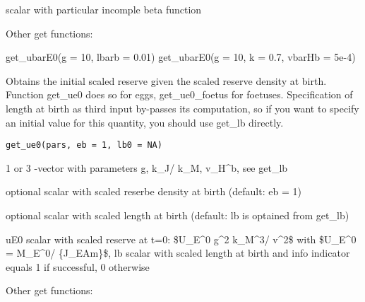 \documentclass[a4paper]{book}
\begin{document}
%
\begin{Value}
scalar with particular incomple beta function
\end{Value}
%
\begin{SeeAlso}\relax
Other get functions: 
\end{SeeAlso}
%
\begin{Examples}
\begin{ExampleCode}
get_ubarE0(g = 10, lbarb = 0.01)
get_ubarE0(g = 10, k = 0.7, vbarHb = 5e-4)
\end{ExampleCode}
\end{Examples}
%
\begin{Description}\relax
Obtains the initial scaled reserve given the scaled reserve density at birth.
Function get\_ue0 does so for eggs, get\_ue0\_foetus for foetuses.
Specification of length at birth as third input by-passes its computation,
so if you want to specify an initial value for this quantity, you should use get\_lb directly.
\end{Description}
%
\begin{Usage}
\begin{verbatim}
get_ue0(pars, eb = 1, lb0 = NA)
\end{verbatim}
\end{Usage}
%
\begin{Arguments}
\begin{ldescription}
\item[\code{pars}] 1 or 3 -vector with parameters g, k\_J/ k\_M, v\_H\textasciicircum{}b, see get\_lb

\item[\code{eb}] optional scalar with scaled reserbe density at birth (default: eb = 1)

\item[\code{lb0}] optional scalar with scaled length at birth (default: lb is optained from get\_lb)
\end{ldescription}
\end{Arguments}
%
\begin{Value}
uE0 scalar with scaled reserve at t=0: \$U\_E\textasciicircum{}0 g\textasciicircum{}2 k\_M\textasciicircum{}3/ v\textasciicircum{}2\$ with \$U\_E\textasciicircum{}0 = M\_E\textasciicircum{}0/ \{J\_EAm\}\$, lb scalar with scaled length at birth and info indicator equals 1 if successful, 0 otherwise
\end{Value}
%
\begin{SeeAlso}\relax
Other get functions: 
\end{SeeAlso}
\end{document}
